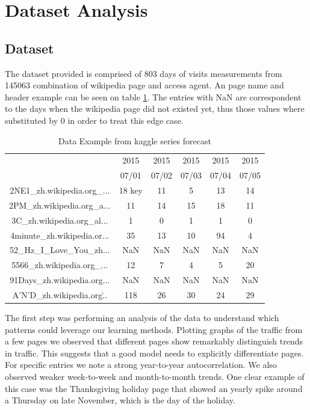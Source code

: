 \section{Dataset Analysis}

\subsection{Dataset}
The dataset provided is comprised of 803 days of visits measurements from 145063 combination of wikipedia page and access agent. An page name and header example can be seen on table \ref{tab:wiki_data}. The entries with NaN are correspondent to the days when the wikipedia page did not existed yet, thus those values where substituted by 0 in order to treat this edge case.

\begin{table}[htbp]
\centering
	\begin{tabular}{|c|c|c|c|c|c|}\hline
		&2015&2015&2015&2015&2015\\
		&07/01&07/02&07/03&07/04&07/05\\\hline
		2NE1\_zh.wikipedia.org\_...& 18  key& 11  & 5   & 13  & 14 \\\hline
		2PM\_zh.wikipedia.org\_a...& 11  & 14  & 15  & 18  & 11 \\\hline
		3C\_zh.wikipedia.org\_al...& 1   & 0   & 1   & 1   & 0 \\ \hline
		4minute\_zh.wikipedia.or...& 35  & 13  & 10  & 94  & 4 \\\hline
		52\_Hz\_I\_Love\_You\_zh...& NaN & NaN & NaN & NaN & NaN \\\hline
		5566\_zh.wikipedia.org\_...& 12 & 7 & 4 & 5 & 20 \\\hline
		91Days\_zh.wikipedia.org...&NaN&NaN&NaN&NaN&NaN \\\hline
		A'N'D\_zh.wikipedia.org\...& 118 & 26 & 30 & 24 & 29\\\hline
	\end{tabular}
	\vspace{1mm}
		\caption{Data Example from kaggle series forecast\label{tab:wiki_data}}
\end{table}

The first step was performing an analysis of the data to understand which patterns could leverage our learning methods. Plotting graphs of the traffic from a few pages we observed that different pages show remarkably distinguish trends in traffic. This suggests that a good model needs to explicitly differentiate pages.
For specific entries we note a strong year-to-year autocorrelation. We also observed weaker week-to-week and month-to-month trends. One clear example of this case was the Thanksgiving holiday page that showed an yearly spike around a Thursday on late November, which is the day of the holiday.

